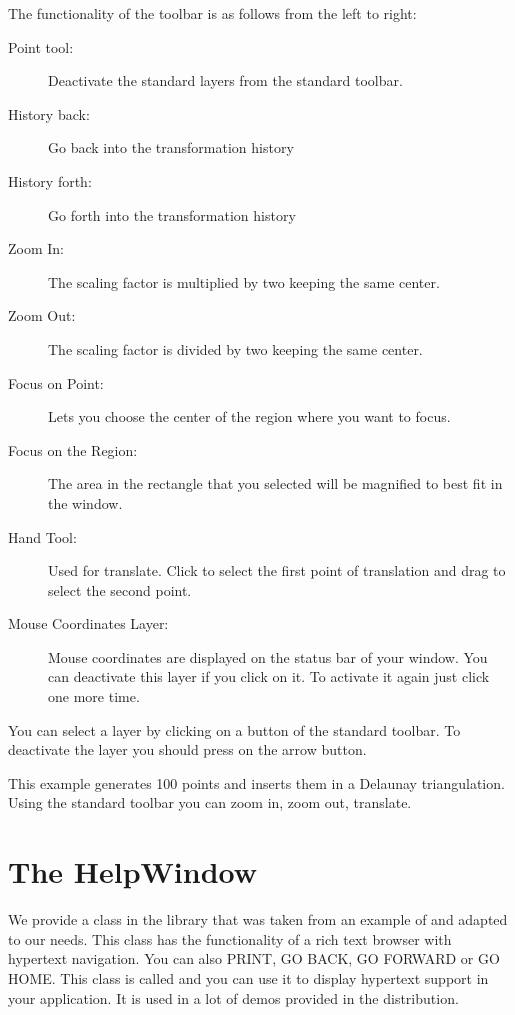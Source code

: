 The functionality of the toolbar is as follows from the left to right:
\begin{description}
        \item[Point tool:] Deactivate the standard layers from the
standard toolbar.
	\item[History back:] Go back into the transformation history
	\item[History forth:] Go forth into the transformation history
        \item[Zoom In:] The scaling factor is multiplied by two
keeping the same center.
        \item[Zoom Out:] The scaling factor is divided by two keeping
the same center.
        \item[Focus on Point:] Lets you choose the center of the
region where you want to focus.
        \item[Focus on the Region:] The area in the rectangle that you selected will be magnified to best fit in the window.
        \item[Hand Tool:] Used for translate. Click to select the
first point of translation and drag to select the second point.
        \item[Mouse Coordinates Layer:] Mouse coordinates are
displayed on the status bar of your window. You can deactivate this
layer if you click on it. To activate it again just click one more time.
\end{description}

You can select a layer by clicking on a button of the standard
toolbar. To deactivate the layer you should press on the arrow button.

\ccExample
{}

This example generates 100 points and inserts them in a Delaunay
triangulation. Using the standard toolbar you can zoom in, zoom out,
translate.

\section{The HelpWindow}
\label{The HelpWindow}

We provide a class in the  library that was taken from
an example of  and adapted to our needs. This class has the
functionality of a rich text browser with hypertext navigation. You
can also PRINT, GO BACK, GO FORWARD or GO HOME. This class is called
 and you can use it to display hypertext support
in your application. It is used in a lot of demos provided in the
distribution.

